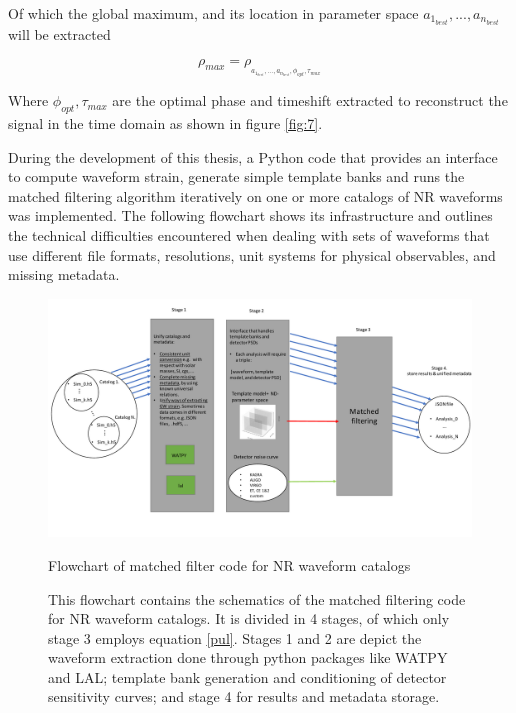 Of which the global maximum, and its location in parameter space $a_{1_{best}},...,a_{n_{best}}$ will be extracted 

\begin{equation}
\rho_{max} = \rho_{_{a_{1_{best}},...,a_{n_{best}},\phi_{opt},\tau_{max}}}
\end{equation}

Where $\phi_{opt},\tau_{max}$ are the optimal phase and timeshift extracted to reconstruct the signal in the time domain as shown in figure \ref{fig:7}. 

During the development of this thesis, a Python code that provides an interface to compute waveform strain, generate simple template banks and runs the matched filtering algorithm iteratively on one or more catalogs of NR waveforms was implemented. The following flowchart shows its infrastructure and outlines the technical difficulties encountered when dealing with sets of waveforms that use different file formats, resolutions, unit systems for physical observables, and missing metadata.


\newpage


\begin{figure}
\begin{center}
\includegraphics[width=\textwidth, angle=0]{images/cat_search.pdf}
\captionsetup{width=0.8\textwidth}
\caption{Flowchart of matched filter code for NR waveform catalogs}
\caption*{This flowchart contains the schematics of the matched filtering code for NR waveform catalogs\cite{}. It is divided in 4 stages, of which only stage 3 employs equation \ref{pul}. Stages 1 and 2 are depict the waveform extraction done through python packages like WATPY and LAL; template bank generation and conditioning of detector sensitivity curves; and stage 4 for results and metadata storage.}
\label{fig:19}
\end{center}
\end{figure}

